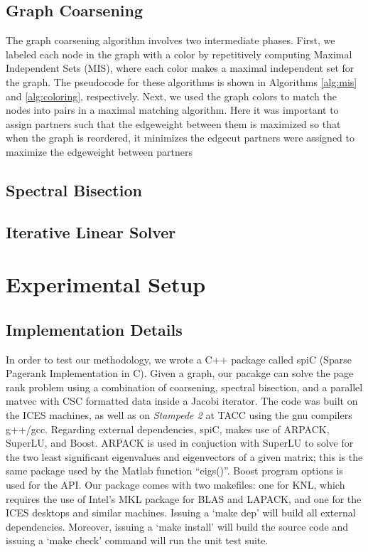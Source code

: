 \documentclass[11pt]{article}
\begin{document}
\subsection{Graph Coarsening}

The graph coarsening algorithm involves two intermediate phases. First, we
labeled each node in the graph with a color by repetitively computing Maximal
Independent Sets (MIS), where each color makes a maximal independent set for the
graph. The pseudocode for these algorithms is shown in
Algorithms \ref{alg:mis} and \ref{alg:coloring}, respectively. Next, we used the
graph colors to match the nodes into pairs in a maximal matching algorithm. Here
it was important to assign partners such that the edgeweight between them is
maximized so that when the graph is reordered, it minimizes the edgecut partners
were assigned to maximize the edgeweight between partners 


\subsection{Spectral Bisection}

\subsection{Iterative Linear Solver}




\section{Experimental Setup}
\subsection{Implementation Details}

In order to test our methodology, we wrote a C++
package called {\rm spiC} (Sparse Pagerank Implementation in C). Given a
graph, our pacakge can solve the page rank problem using a combination of coarsening, spectral
bisection, and a parallel matvec with CSC formatted data inside a Jacobi
iterator. The code was built on the ICES machines, as well as on \textit{Stampede 2} at TACC using the gnu
compilers g++/gcc. Regarding external dependencies, {\rm spiC}, makes use of
{\rm ARPACK}, {\rm SuperLU}, and {\rm Boost}. {\rm ARPACK} is used in conjuction
with {\rm SuperLU} to solve for the two least significant eigenvalues and
eigenvectors of a given
matrix; this is the same package used by the Matlab function ``eigs()''. {\rm
Boost} program options is used for the API. Our package comes with two
makefiles: one for KNL, which requires the use of Intel's MKL package for BLAS
and LAPACK, and one for the ICES desktops and similar machines. Issuing a `make
dep' will build all external dependencies. Moreover, issuing a `make install' will
build the source code and issuing a `make check' command will run the unit test suite.  
\end{document}
